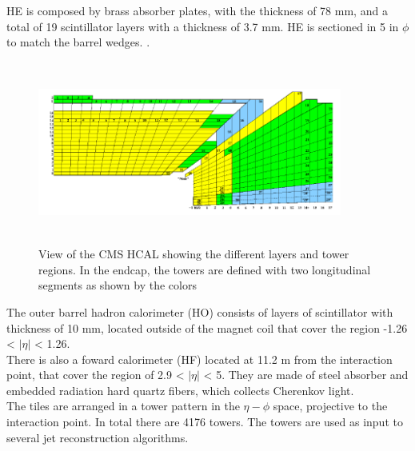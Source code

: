 HE is composed by brass absorber plates, with the thickness of 78 mm, and a total of 19 scintillator layers with a thickness of 3.7 mm. HE is sectioned in 5 in $\phi$ to match the barrel wedges.
. %
\\
\begin{figure}[!htbp]
	\centering
	\includegraphics[width=10cm,height=6cm]{Chapter2/hcal.png}
	\caption[View of the CMS HCAL showing the different layers and tower regions. In the endcap, the towers are defined with two longitudinal segments as shown by the colors]{View of the CMS HCAL showing the different layers and tower regions. In the endcap, the towers are defined with two longitudinal segments as shown by the colors\cite{cms-manual}}\label{hcal}
\end{figure}
The outer barrel hadron calorimeter (HO) consists of layers of scintillator with thickness of 10 mm, located outside of the
magnet coil that cover the region -1.26 < $|\eta|$ < 1.26.\\
There is also a foward calorimeter (HF) located at 11.2 m from the interaction point, that cover the region of 2.9 < $|\eta|$ < 5. They are made of
steel absorber and embedded radiation hard quartz fibers, which collects 
Cherenkov light\cite{cms-manual}.%
\\
 
The tiles are arranged in a tower pattern in the $\eta-\phi$ space, projective to the interaction point. In total there
are 4176 towers. The towers are used as input to several jet reconstruction algorithms.

